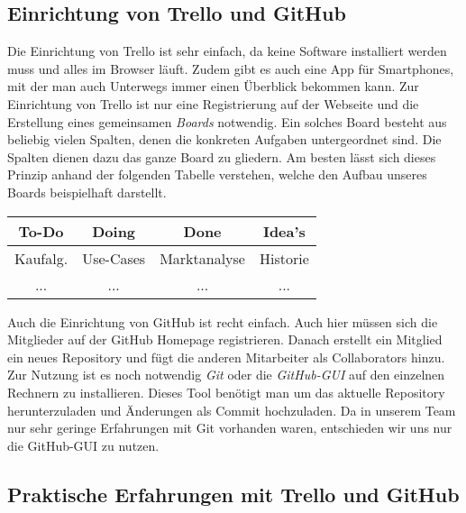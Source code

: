 \subsection{Einrichtung von Trello und GitHub}
 Die Einrichtung von Trello ist sehr einfach, da keine Software installiert werden muss und alles im Browser läuft. Zudem gibt es auch eine App für Smartphones, mit der man auch Unterwegs immer einen Überblick bekommen kann. Zur Einrichtung von Trello ist nur eine Registrierung auf der Webseite und die Erstellung eines gemeinsamen \textit{Boards} notwendig. Ein solches Board besteht aus beliebig vielen Spalten, denen die konkreten Aufgaben untergeordnet sind. Die Spalten dienen dazu das ganze Board zu gliedern. Am besten lässt sich dieses Prinzip anhand der folgenden Tabelle verstehen, welche den Aufbau unseres Boards beispielhaft darstellt.\\
\begin{center}
\begin{tabular}{|c|c|c|c|}\hline
  \textbf{ To-Do} & \textbf{Doing} & \textbf{Done} & \textbf{Idea's} \\ \hline
   Kaufalg. & Use-Cases & Marktanalyse & Historie \\ \hline
   ... & ... & ... & ...\\ \hline
 \end{tabular}
\end{center}
Auch die Einrichtung von GitHub ist recht einfach. Auch hier müssen sich die Mitglieder auf der GitHub Homepage registrieren. Danach erstellt ein Mitglied ein neues Repository und fügt die anderen Mitarbeiter als Collaborators hinzu. Zur Nutzung ist es noch notwendig \textit{Git} oder die \textit{GitHub-GUI} auf den einzelnen Rechnern zu installieren. Dieses Tool benötigt man um das aktuelle Repository herunterzuladen und Änderungen als Commit hochzuladen. Da in unserem Team nur sehr geringe Erfahrungen mit Git vorhanden waren, entschieden wir uns nur die GitHub-GUI zu nutzen.

\subsection{Praktische Erfahrungen mit Trello und GitHub}

